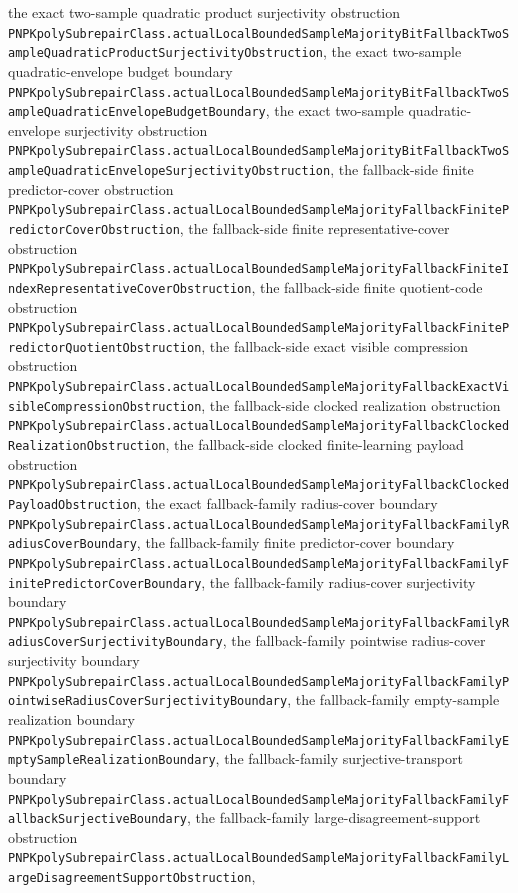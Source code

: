 \documentclass[11pt]{article}
\theoremstyle{remark}
\begin{document}
the exact two-sample quadratic product surjectivity obstruction
\texttt{PNPKpolySubrepairClass.actualLocalBoundedSampleMajorityBitFallbackTwoSampleQuadraticProductSurjectivityObstruction},
the exact two-sample quadratic-envelope budget boundary
\texttt{PNPKpolySubrepairClass.actualLocalBoundedSampleMajorityBitFallbackTwoSampleQuadraticEnvelopeBudgetBoundary},
the exact two-sample quadratic-envelope surjectivity obstruction
\texttt{PNPKpolySubrepairClass.actualLocalBoundedSampleMajorityBitFallbackTwoSampleQuadraticEnvelopeSurjectivityObstruction},
the fallback-side finite predictor-cover obstruction
\texttt{PNPKpolySubrepairClass.actualLocalBoundedSampleMajorityFallbackFinitePredictorCoverObstruction},
the fallback-side finite representative-cover obstruction
\texttt{PNPKpolySubrepairClass.actualLocalBoundedSampleMajorityFallbackFiniteIndexRepresentativeCoverObstruction},
the fallback-side finite quotient-code obstruction
\texttt{PNPKpolySubrepairClass.actualLocalBoundedSampleMajorityFallbackFinitePredictorQuotientObstruction},
the fallback-side exact visible compression obstruction
\texttt{PNPKpolySubrepairClass.actualLocalBoundedSampleMajorityFallbackExactVisibleCompressionObstruction},
the fallback-side clocked realization obstruction
\texttt{PNPKpolySubrepairClass.actualLocalBoundedSampleMajorityFallbackClockedRealizationObstruction},
the fallback-side clocked finite-learning payload obstruction
\texttt{PNPKpolySubrepairClass.actualLocalBoundedSampleMajorityFallbackClockedPayloadObstruction},
the exact fallback-family radius-cover boundary
\texttt{PNPKpolySubrepairClass.actualLocalBoundedSampleMajorityFallbackFamilyRadiusCoverBoundary},
the fallback-family finite predictor-cover boundary
\texttt{PNPKpolySubrepairClass.actualLocalBoundedSampleMajorityFallbackFamilyFinitePredictorCoverBoundary},
the fallback-family radius-cover surjectivity boundary
\texttt{PNPKpolySubrepairClass.actualLocalBoundedSampleMajorityFallbackFamilyRadiusCoverSurjectivityBoundary},
the fallback-family pointwise radius-cover surjectivity boundary
\texttt{PNPKpolySubrepairClass.actualLocalBoundedSampleMajorityFallbackFamilyPointwiseRadiusCoverSurjectivityBoundary},
the fallback-family empty-sample realization boundary
\texttt{PNPKpolySubrepairClass.actualLocalBoundedSampleMajorityFallbackFamilyEmptySampleRealizationBoundary},
the fallback-family surjective-transport boundary
\texttt{PNPKpolySubrepairClass.actualLocalBoundedSampleMajorityFallbackFamilyFallbackSurjectiveBoundary},
the fallback-family large-disagreement-support obstruction
\texttt{PNPKpolySubrepairClass.actualLocalBoundedSampleMajorityFallbackFamilyLargeDisagreementSupportObstruction},
\end{document}

